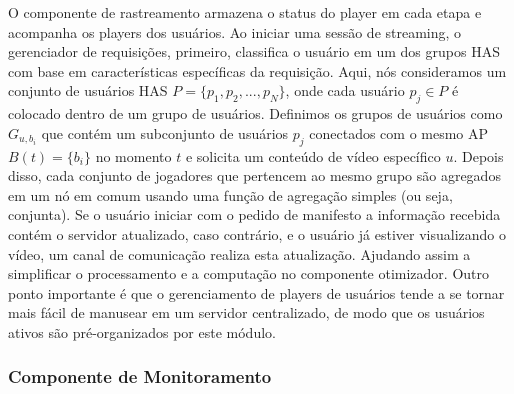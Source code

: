 O componente de rastreamento armazena o status do player em cada etapa e acompanha os players dos usuários. Ao iniciar uma sessão de streaming, o gerenciador de requisições, primeiro, classifica o usuário em um dos grupos HAS com base em características específicas da requisição. Aqui, nós consideramos um conjunto de usuários HAS $P = \{p_1,p_2, ..., p_N\}$, onde cada usuário $p_j \in P$ é colocado dentro de um grupo de usuários. Definimos os grupos de usuários como $G_{u,b_{i}}$ que contém um subconjunto de usuários $p_j$ conectados com o mesmo AP $B(t) = \{b_{i}\}$ no momento $t$ e solicita um conteúdo de vídeo específico $u$. Depois disso, cada conjunto de jogadores que pertencem ao mesmo grupo são agregados em um nó em comum usando uma função de agregação simples (ou seja, conjunta).
Se o usuário iniciar com o pedido de manifesto a informação recebida contém o servidor atualizado, caso contrário, e o usuário já estiver visualizando o vídeo, um canal de comunicação realiza esta atualização. Ajudando assim a simplificar o processamento e a computação no componente otimizador.
Outro ponto importante é que o gerenciamento de players de usuários tende a se tornar mais fácil de manusear em um servidor centralizado, de modo que os usuários ativos são pré-organizados por este módulo.


\subsubsection*{Componente de Monitoramento}

